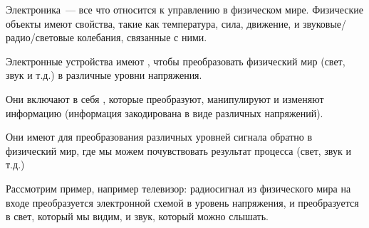 
Электроника\ --- все что относится к управлению в физическом мире. Физические
объекты имеют свойства, такие как температура, сила, движение, и
звуковые/радио/световые колебания, связанные с ними.

\bigskip
Электронные устройства имеют , чтобы
преобразовать физический мир (свет, звук и т.д.) в различные уровни напряжения. 

Они включают в себя , которые преобразуют,
манипулируют и изменяют информацию (информация закодирована в виде различных
напряжений).

Они имеют  для преобразования различных
уровней сигнала обратно в физический мир, где мы можем почувствовать результат
процесса (свет, звук и т.д.)

\bigskip
Рассмотрим пример, например телевизор: радиосигнал из физического мира на входе
преобразуется электронной схемой в уровень напряжения, и преобразуется в свет,
который мы видим, и звук, который можно слышать.
